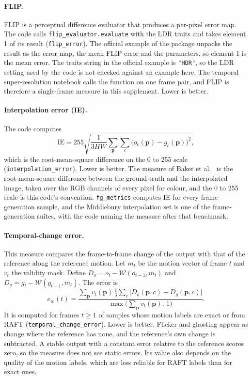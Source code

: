 \paragraph{FLIP.} FLIP \cite{andersson2020flip} is a perceptual difference evaluator that produces a per-pixel error map. The code calls \texttt{flip\_evaluator.evaluate} with the LDR traits and takes element 1 of its result (\texttt{flip\_error}). The official example of the package unpacks the result as the error map, the mean FLIP error and the parameters, so element 1 is the mean error. The traits string in the official example is \texttt{"HDR"}, so the LDR setting used by the code is not checked against an example here. The temporal super-resolution notebook calls the function on one frame pair, and FLIP is therefore a single-frame measure in this supplement. Lower is better.

\paragraph{Interpolation error (IE).} The code computes
\begin{equation}
\mathrm{IE}=255\sqrt{\frac{1}{3HW}\sum_{\mathbf p}\sum_{c}\big(o_c(\mathbf p)-g_c(\mathbf p)\big)^2},\label{eq:bg-ie}
\end{equation}
which is the root-mean-square difference on the 0 to 255 scale (\texttt{interpolation\_error}). Lower is better. The measure of Baker et al.\ \cite{baker2011middlebury} is the root-mean-square difference between the ground-truth and the interpolated image, taken over the RGB channels of every pixel for colour, and the 0 to 255 scale is this code's convention. \texttt{fg\_metrics} computes IE for every frame-generation sample, and the Middlebury interpolation set \cite{baker2011middlebury} is one of the frame-generation suites, with the code naming the measure after that benchmark.

\paragraph{Temporal-change error.} This measure compares the frame-to-frame change of the output with that of the reference along the reference motion. Let $m_t$ be the motion vector of frame $t$ and $v_t$ the validity mask. Define $D_o=o_t-\mathcal W(o_{t-1},m_t)$ and $D_g=g_t-\mathcal W(g_{t-1},m_t)$. The error is
\begin{equation}
e_{\text{tc}}(t)=\frac{\sum_{\mathbf p}v_t(\mathbf p)\,\tfrac13\sum_c\big|D_o(\mathbf p,c)-D_g(\mathbf p,c)\big|}{\max\big(\sum_{\mathbf p}v_t(\mathbf p),\,1\big)}.\label{eq:bg-tce}
\end{equation}
It is computed for frames $t\ge1$ of samples whose motion labels are exact or from RAFT (\texttt{temporal\_change\_error}). Lower is better. Flicker and ghosting appear as change where the reference has none, and the reference's own change is subtracted. A stable output with a constant error relative to the reference scores zero, so the measure does not see static errors. Its value also depends on the quality of the motion labels, which are less reliable for RAFT labels than for exact ones.

